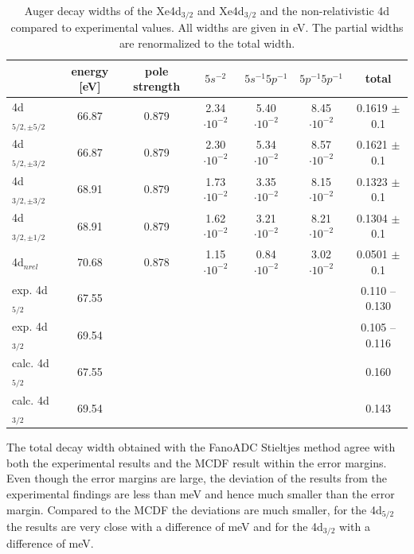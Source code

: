 \begin{table}[h]
 \centering
 \footnotesize
 \caption{Auger decay widths of the Xe4d$_{3/2}$ and Xe4d$_{3/2}$
          and the non-relativistic
          4d compared to experimental values\cite{Ausmees99}.
          All widths are given in \unit{eV}.
          The partial widths are renormalized to the total width.}
 \begin{tabular}{lcccccc}
   \toprule
               & energy [\unit{eV}] & pole strength & $5s^{-2}$          & $5s^{-1}5p^{-1}$   & $5p^{-1}5p^{-1}$   & total \\
   \midrule                                                                                     
     4d$_{5/2,\pm 5/2}$ &  66.87    &   0.879       & 2.34$\cdot10^{-2}$ & 5.40$\cdot10^{-2}$ & 8.45$\cdot10^{-2}$ & 0.1619 $\pm$ 0.1\\
     4d$_{5/2,\pm 3/2}$ &  66.87    &   0.879       & 2.30$\cdot10^{-2}$ & 5.34$\cdot10^{-2}$ & 8.57$\cdot10^{-2}$ & 0.1621 $\pm$ 0.1\\
     4d$_{3/2,\pm 3/2}$ &  68.91    &   0.879       & 1.73$\cdot10^{-2}$ & 3.35$\cdot10^{-2}$ & 8.15$\cdot10^{-2}$ & 0.1323 $\pm$ 0.1\\
     4d$_{3/2,\pm 1/2}$ &  68.91    &   0.879       & 1.62$\cdot10^{-2}$ & 3.21$\cdot10^{-2}$ & 8.21$\cdot10^{-2}$ & 0.1304 $\pm$ 0.1\\
     4d$_{nrel}$        &  70.68    &   0.878       & 1.15$\cdot10^{-2}$ & 0.84$\cdot10^{-2}$ & 3.02$\cdot10^{-2}$ & 0.0501 $\pm$ 0.1\\
     \midrule
     exp. 4d$_{5/2}$    &  67.55 \cite{King77}   &      &       &   &    & 0.110 -- 0.130 \cite{Ausmees99} \\
     exp. 4d$_{3/2}$    &  69.54 \cite{King77}   &      &       &   &    & 0.105 -- 0.116 \cite{Ausmees99} \\
     calc. 4d$_{5/2}$ \cite{Maentykenttae93} &67.55&    &       &   &    & 0.160  \\
     calc. 4d$_{3/2}$ \cite{Maentykenttae93} &69.54&    &       &   &    & 0.143  \\
   \bottomrule                                                                                 
 \end{tabular}                                                                                 
 \label{table:xe_auger_4d_rates}
\end{table}

The total decay width obtained with the FanoADC Stieltjes method agree with
both the experimental results and the \ac{MCDF} result within the error margins.
Even though the error margins are large, the deviation of the results
from the experimental findings are
less than \unit[52]{meV} and hence much smaller than the error margin. 
Compared to the \ac{MCDF} the deviations are much smaller, for the 4d$_{5/2}$
the results are very close with a difference of \unit[2]{meV} and for the
4d$_{3/2}$ with a difference of \unit[10]{meV}.


